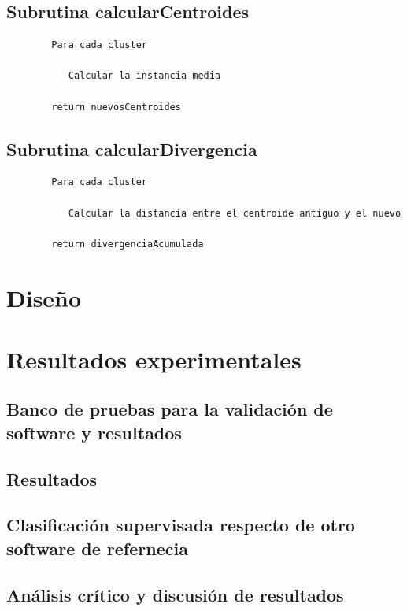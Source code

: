 \documentclass[a4paper]{report}
\begin{document}
	\section{Subrutina calcularCentroides}
	
		\begin{verbatim}
		Para cada cluster
		
		   Calcular la instancia media
		   
		return nuevosCentroides
		\end{verbatim}
	
	\section{Subrutina calcularDivergencia}
	
		\begin{verbatim}
		Para cada cluster 
		   
		   Calcular la distancia entre el centroide antiguo y el nuevo
		   
		return divergenciaAcumulada
		\end{verbatim}

\chapter{Diseño}



\chapter{Resultados experimentales}

	\section{Banco de pruebas para la validación de software y resultados}
	
	\section{Resultados}
	
	\section{Clasificación supervisada respecto de otro software de refernecia}
	
	\section{Análisis crítico y discusión de resultados}
	
\end{document}
